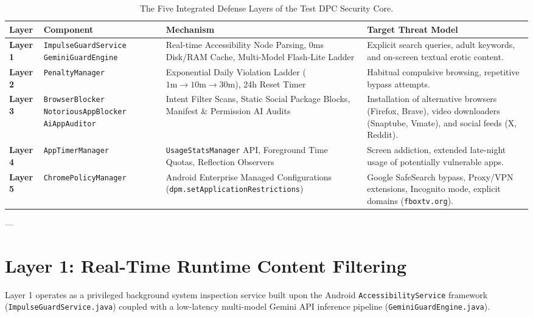 \documentclass[11pt,a4paper]{article}
\begin{document}
\begin{table}[h!]
\centering
\small
\begin{tabularx}{\textwidth}{l p{3.2cm} p{4.2cm} X}
\toprule
\textbf{Layer} & \textbf{Component} & \textbf{Mechanism} & \textbf{Target Threat Model} \\
\midrule
\textbf{Layer 1} & \texttt{ImpulseGuardService} \newline \texttt{GeminiGuardEngine} & Real-time Accessibility Node Parsing, 0ms Disk/RAM Cache, Multi-Model Flash-Lite Ladder & Explicit search queries, adult keywords, and on-screen textual erotic content. \\
\addlinespace
\textbf{Layer 2} & \texttt{PenaltyManager} & Exponential Daily Violation Ladder ($1\text{m} \to 10\text{m} \to 30\text{m}$), 24h Reset Timer & Habitual compulsive browsing, repetitive bypass attempts. \\
\addlinespace
\textbf{Layer 3} & \texttt{BrowserBlocker} \newline \texttt{NotoriousAppBlocker} \newline \texttt{AiAppAuditor} & Intent Filter Scans, Static Social Package Blocks, Manifest \& Permission AI Audits & Installation of alternative browsers (Firefox, Brave), video downloaders (Snaptube, Vmate), and social feeds (X, Reddit). \\
\addlinespace
\textbf{Layer 4} & \texttt{AppTimerManager} & \texttt{UsageStatsManager} API, Foreground Time Quotas, Reflection Observers & Screen addiction, extended late-night usage of potentially vulnerable apps. \\
\addlinespace
\textbf{Layer 5} & \texttt{ChromePolicyManager} & Android Enterprise Managed Configurations (\texttt{dpm.setApplicationRestrictions}) & Google SafeSearch bypass, Proxy/VPN extensions, Incognito mode, explicit domains (\texttt{fboxtv.org}). \\
\bottomrule
\end{tabularx}
\caption{The Five Integrated Defense Layers of the Test DPC Security Core.}
\label{tab:layers}
\end{table}

---

\section{Layer 1: Real-Time Runtime Content Filtering}

Layer 1 operates as a privileged background system inspection service built upon the Android \texttt{AccessibilityService} framework (\texttt{ImpulseGuardService.java}) coupled with a low-latency multi-model Gemini API inference pipeline (\texttt{GeminiGuardEngine.java}).
\end{document}
